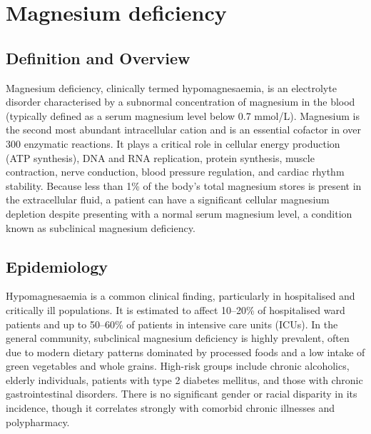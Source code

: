 \chapter{Magnesium deficiency}

\section*{Definition and Overview}
Magnesium deficiency, clinically termed hypomagnesaemia, is an electrolyte disorder characterised by a subnormal concentration of magnesium in the blood (typically defined as a serum magnesium level below 0.7 mmol/L). Magnesium is the second most abundant intracellular cation and is an essential cofactor in over 300 enzymatic reactions. It plays a critical role in cellular energy production (ATP synthesis), DNA and RNA replication, protein synthesis, muscle contraction, nerve conduction, blood pressure regulation, and cardiac rhythm stability. Because less than 1\% of the body's total magnesium stores is present in the extracellular fluid, a patient can have a significant cellular magnesium depletion despite presenting with a normal serum magnesium level, a condition known as subclinical magnesium deficiency.

\section*{Epidemiology}
Hypomagnesaemia is a common clinical finding, particularly in hospitalised and critically ill populations. It is estimated to affect 10--20\% of hospitalised ward patients and up to 50--60\% of patients in intensive care units (ICUs). In the general community, subclinical magnesium deficiency is highly prevalent, often due to modern dietary patterns dominated by processed foods and a low intake of green vegetables and whole grains. High-risk groups include chronic alcoholics, elderly individuals, patients with type 2 diabetes mellitus, and those with chronic gastrointestinal disorders. There is no significant gender or racial disparity in its incidence, though it correlates strongly with comorbid chronic illnesses and polypharmacy.


